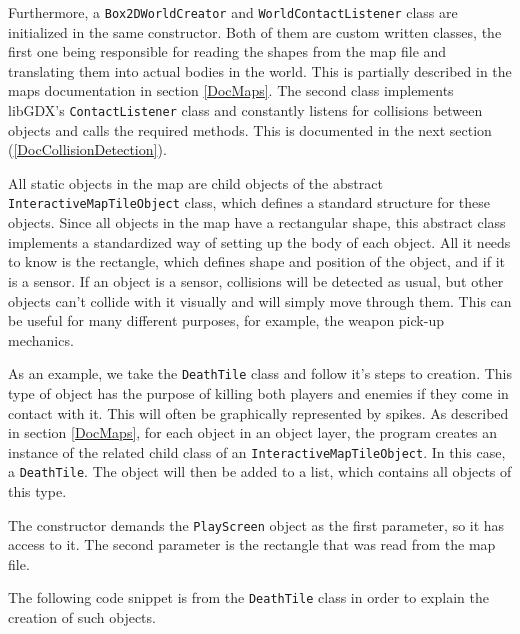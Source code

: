 \documentclass[12p]{article}
\begin{document}

Furthermore, a \texttt{Box2DWorldCreator} and \texttt{WorldContactListener} class are initialized in the same constructor. Both of them are custom written classes, the first one being responsible for reading the shapes from the map file and translating them into actual bodies in the world. This is partially described in the maps documentation in section \ref{DocMaps}. The second class implements libGDX's \texttt{ContactListener} class and constantly listens for collisions between objects and calls the required methods. This is documented in the next section (\ref{DocCollisionDetection}).

All static objects in the map are child objects of the abstract \texttt{InteractiveMapTileObject} class, which defines a standard structure for these objects. Since all objects in the map have a rectangular shape, this abstract class implements a standardized way of setting up the body of each object. All it needs to know is the rectangle, which defines shape and position of the object, and if it is a sensor. If an object is a sensor, collisions will be detected as usual, but other objects can't collide with it visually and will simply move through them. This can be useful for many different purposes, for example, the weapon pick-up mechanics.

As an example, we take the \texttt{DeathTile} class and follow it's steps to creation. This type of object has the purpose of killing both players and enemies if they come in contact with it. This will often be graphically represented by spikes. As described in section \ref{DocMaps}, for each object in an object layer, the program creates an instance of the related child class of an \texttt{InteractiveMapTileObject}. In this case, a \texttt{DeathTile}. The object will then be added to a list, which contains all objects of this type.


The constructor demands the \texttt{PlayScreen} object as the first parameter, so it has access to it. The second parameter is the rectangle that was read from the map file.

The following code snippet is from the \texttt{DeathTile} class in order to explain the creation of such objects.
\end{document}
